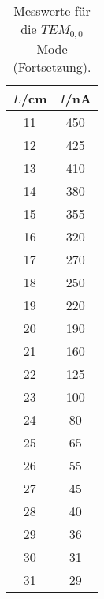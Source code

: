 \begin{table}[htp]
	\begin{center}
    \caption{Messwerte für die $TEM_{0,0}$ Mode (Fortsetzung).}
    \label{tab:tem00b}
		\begin{tabular}{cc}
		\toprule
			{$L$/cm} & {$I$/nA}\\
			\midrule
      11 & 450\\
      12 & 425\\
      13 & 410\\
      14 & 380\\
      15 & 355\\
      16 & 320\\
      17 & 270\\
      18 & 250\\
      19 & 220\\
      20 & 190\\
      21 & 160\\
      22 & 125\\
      23 & 100\\
      24 & 80\\
      25 & 65\\
      26 & 55\\
      27 & 45\\
      28 & 40\\
      29 & 36\\
      30 & 31\\
      31 & 29\\
      \bottomrule
    \end{tabular}
  \end{center}
\end{table}

